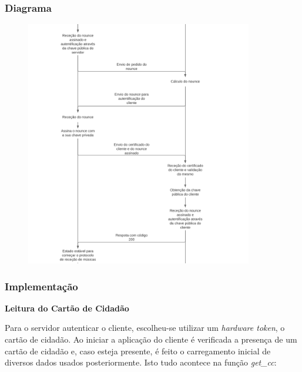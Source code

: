 \documentclass[10pt,english]{article}
\begin{document}
\subsubsection{Diagrama}
\vspace*{1cm}
    \begin{figure}[!h]
            \centering
            \includegraphics[width=375]{images/5.png}
    \end{figure}

\clearpage

\subsubsection{Implementação}

\textbf{Leitura do Cartão de Cidadão}

\par Para o servidor autenticar o cliente, escolheu-se utilizar um \textit{hardware token}, o cartão de cidadão. Ao iniciar a aplicação do cliente é verificada a presença de um cartão de cidadão e, caso esteja presente, é feito o carregamento inicial de diversos dados usados posteriormente. Isto tudo acontece na função \textit{get\_cc}:
\end{document}

